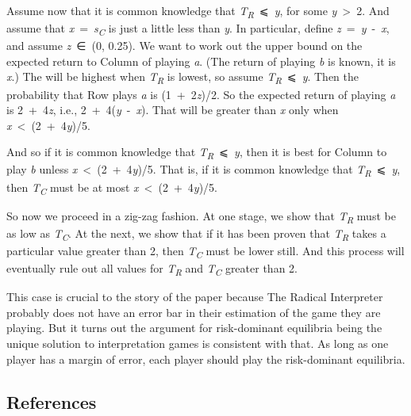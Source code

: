 \documentclass[
  11pt,
  letterpaper,
  DIV=11,
  numbers=noendperiod,
  twoside]{scrartcl}
\begin{document}
Assume now that it is common knowledge that
\emph{T\textsubscript{R}}~⩽~\emph{y}, for some \emph{y}~\textgreater~2.
And assume that \emph{x}~=~\emph{s\textsubscript{C}} is just a little
less than \emph{y}. In particular, define
\emph{z}~=~\emph{y}~-~\emph{x}, and assume \emph{z}~∈~(0, 0.25). We want
to work out the upper bound on the expected return to Column of playing
\emph{a}. (The return of playing \emph{b} is known, it is \emph{x}.) The
will be highest when \emph{T\textsubscript{R}} is lowest, so assume
\emph{T\textsubscript{R}}~⩽~\emph{y}. Then the probability that Row
plays \emph{a} is (1~+~2\emph{z})/2. So the expected return of playing
\emph{a} is 2~+~4\emph{z}, i.e., 2~+~4(\emph{y}~-~\emph{x}). That will
be greater than \emph{x} only when \emph{x}~\textless~(2~+~4\emph{y})/5.

And so if it is common knowledge that
\emph{T\textsubscript{R}}~⩽~\emph{y}, then it is best for Column to play
\emph{b} unless \emph{x}~\textless~(2~+~4\emph{y})/5. That is, if it is
common knowledge that \emph{T\textsubscript{R}}~⩽~\emph{y}, then
\emph{T\textsubscript{C}} must be at most
\emph{x}~\textless~(2~+~4\emph{y})/5.

So now we proceed in a zig-zag fashion. At one stage, we show that
\emph{T\textsubscript{R}} must be as low as \emph{T\textsubscript{C}}.
At the next, we show that if it has been proven that
\emph{T\textsubscript{R}} takes a particular value greater than 2, then
\emph{T\textsubscript{C}} must be lower still. And this process will
eventually rule out all values for \emph{T\textsubscript{R}} and
\emph{T\textsubscript{C}} greater than 2.

This case is crucial to the story of the paper because The Radical
Interpreter probably does not have an error bar in their estimation of
the game they are playing. But it turns out the argument for
risk-dominant equilibria being the unique solution to interpretation
games is consistent with that. As long as one player has a margin of
error, each player should play the risk-dominant equilibria.

\subsection*{References}\label{references}
\end{document}

